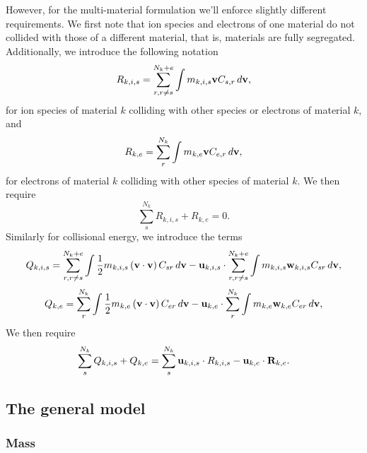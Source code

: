 \documentclass[a4paper,11pt]{report}
\begin{document}
However, for the multi-material formulation we'll enforce slightly different requirements. We first note that ion species and electrons of one material do not collided with those of a different material, that is, materials are fully segregated. Additionally, we  introduce the following notation
\begin{equation*}
    R_{k,i,s} = \sum_{r,r \ne s}^{N_k+e} \int m_{k,i,s} \mathbf{v} C_{s,r} \, d\mathbf{v},
\end{equation*}
for ion species of material $k$ colliding with other species or electrons of material $k$, and
\begin{equation*}
    R_{k,e} = \sum_{r}^{N_k} \int m_{k,e} \mathbf{v} C_{e,r} \, d\mathbf{v},
\end{equation*}
for electrons of material $k$ colliding with other species of material $k$. We then require
\begin{equation*}
    \sum_s^{N_k} R_{k,i,s} + R_{k,e} = 0.
\end{equation*}
Similarly for collisional energy, we introduce the terms
\begin{equation*}
    Q_{k,i,s} = \sum_{r,r \ne s}^{N_k+e} \int \frac{1}{2} m_{k,i,s} \left( \mathbf{v} \cdot \mathbf{v} \right) C_{sr} \, d\mathbf{v} - \mathbf{u}_{k,i,s} \cdot \sum_{r, r \ne s}^{N_k+e} \int m_{k,i,s} \mathbf{w}_{k,i,s} C_{sr} \, d\mathbf{v},
\end{equation*}
\begin{equation*}
    Q_{k,e} = \sum_r^{N_k} \int \frac{1}{2} m_{k,e} \left( \mathbf{v} \cdot \mathbf{v} \right) C_{er} \, d\mathbf{v} - \mathbf{u}_{k,e} \cdot \sum_r^{N_k} \int m_{k,e} \mathbf{w}_{k,e} C_{er} \, d\mathbf{v},
\end{equation*}
We then require
\begin{equation}
    \sum_s^{N_k} Q_{k,i,s} + Q_{k,e} = \sum_s^{N_k} \mathbf{u}_{k,i,s} \cdot R_{k,i,s} - \mathbf{u}_{k,e} \cdot \mathbf{R}_{k,e}.
\end{equation}

\subsection{The general model}
\label{sec:sf_np1_species_general}

\subsubsection{Mass}
\end{document}
